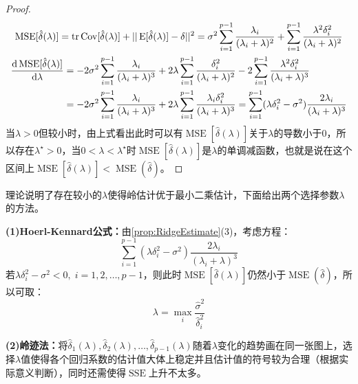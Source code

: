 \begin{proof}
\begin{gather*}
		\operatorname{MSE}[\hat{\delta}(\lambda)]=\operatorname{tr}\operatorname{Cov}[\hat{\delta}(\lambda)]+||\operatorname{E}[\hat{\delta}(\lambda)]-\delta||^2=\sigma^2\sum_{i=1}^{p-1}\frac{\lambda_i}{(\lambda_i+\lambda)^2}+\sum_{i=1}^{p-1}\frac{\lambda^2\delta_i^2}{(\lambda_i+\lambda)^2} \\
		\begin{aligned}
			\frac{\mathop{}\!\mathrm{d}\operatorname{MSE}[\hat{\delta}(\lambda)]}{\mathop{}\!\mathrm{d}\lambda}&=-2\sigma^2\sum_{i=1}^{p-1}\frac{\lambda_i}{(\lambda_i+\lambda)^3}+2\lambda\sum_{i=1}^{p-1}\frac{\delta_i^2}{(\lambda_i+\lambda)^2}-2\sum_{i=1}^{p-1}\frac{\lambda^2\delta_i^2}{(\lambda_i+\lambda)^3} \\
			&=-2\sigma^2\sum_{i=1}^{p-1}\frac{\lambda_i}{(\lambda_i+\lambda)^3}+2\lambda\sum_{i=1}^{p-1}\frac{\lambda_i\delta_i^2}{(\lambda_i+\lambda)^3}=\sum_{i=1}^{p-1}(\lambda\delta_i^2-\sigma^2)\frac{2\lambda_i}{(\lambda_i+\lambda)^3}
		\end{aligned}
	\end{gather*}
	当$\lambda>0$但较小时，由上式看出此时可以有$\operatorname{MSE}[\hat{\delta}(\lambda)]$关于$\lambda$的导数小于$0$，所以存在$\lambda^{\star}>0$，当$0<\lambda<\lambda^{\star}$时$\operatorname{MSE}[\hat{\delta}(\lambda)]$是$\lambda$的单调减函数，也就是说在这个区间上$\operatorname{MSE}[\hat{\delta}(\lambda)]<\operatorname{MSE}(\hat{\delta})$。
\end{proof}
\begin{note}
	理论说明了存在较小的$\lambda$使得岭估计优于最小二乘估计，下面给出两个选择参数$\lambda$的方法。\par
	\textbf{(1)Hoerl-Kennard公式：}由\cref{prop:RidgeEstimate}(3)，考虑方程：
	\begin{equation*}
		\sum_{i=1}^{p-1}(\lambda\delta_i^2-\sigma^2)\frac{2\lambda_i}{(\lambda_i+\lambda)^3}
	\end{equation*}
	若$\lambda\delta_i^2-\sigma^2<0,\;i=1,2,\dots,p-1$，则此时$\operatorname{MSE}[\hat{\delta}(\lambda)]$仍然小于$\operatorname{MSE}(\hat{\delta})$，所以可取：
	\begin{equation*}
		\lambda=\max_i\frac{\hat{\sigma}^2}{\hat{\delta}_i^2}
	\end{equation*}\par
	\textbf{(2)岭迹法：}将$\hat{\delta}_1(\lambda),\hat{\delta}_2(\lambda),\dots,\hat{\delta}_{p-1}(\lambda)$随着$\lambda$变化的趋势画在同一张图上，选择$\lambda$值使得各个回归系数的估计值大体上稳定并且估计值的符号较为合理（根据实际意义判断），同时还需使得$\operatorname{SSE}$上升不太多。
\end{note}
